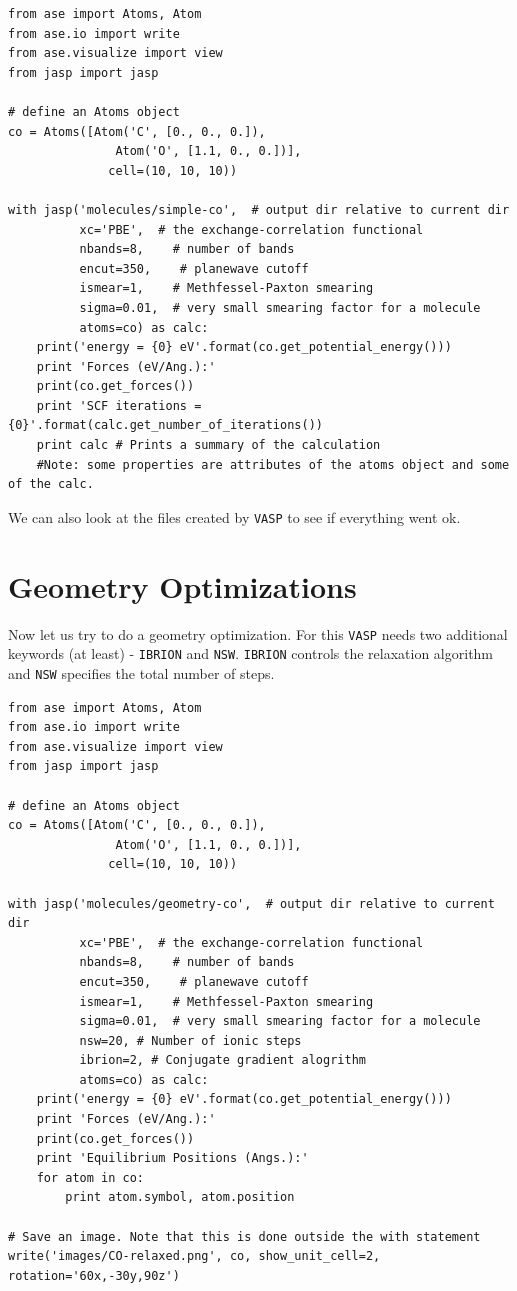 \documentclass[11pt]{article}
\begin{document}
\begin{verbatim}
from ase import Atoms, Atom
from ase.io import write
from ase.visualize import view
from jasp import jasp

# define an Atoms object
co = Atoms([Atom('C', [0., 0., 0.]),
               Atom('O', [1.1, 0., 0.])],
              cell=(10, 10, 10))

with jasp('molecules/simple-co',  # output dir relative to current dir
          xc='PBE',  # the exchange-correlation functional
          nbands=8,    # number of bands
          encut=350,    # planewave cutoff
          ismear=1,    # Methfessel-Paxton smearing
          sigma=0.01,  # very small smearing factor for a molecule
          atoms=co) as calc:
    print('energy = {0} eV'.format(co.get_potential_energy()))
    print 'Forces (eV/Ang.):'
    print(co.get_forces())
    print 'SCF iterations = {0}'.format(calc.get_number_of_iterations())
    print calc # Prints a summary of the calculation
    #Note: some properties are attributes of the atoms object and some of the calc.
\end{verbatim}

We can also look at the files created by \texttt{VASP} to see if everything went ok. 



\section{Geometry Optimizations}
\label{sec-6}

Now let us try to do a geometry optimization. For this \texttt{VASP} needs two additional keywords (at least) - \verb~IBRION~ and \verb~NSW~. \verb~IBRION~ controls the relaxation algorithm and \verb~NSW~ specifies the total number of steps.

\begin{verbatim}
from ase import Atoms, Atom
from ase.io import write
from ase.visualize import view
from jasp import jasp

# define an Atoms object
co = Atoms([Atom('C', [0., 0., 0.]),
               Atom('O', [1.1, 0., 0.])],
              cell=(10, 10, 10))

with jasp('molecules/geometry-co',  # output dir relative to current dir
          xc='PBE',  # the exchange-correlation functional
          nbands=8,    # number of bands
          encut=350,    # planewave cutoff
          ismear=1,    # Methfessel-Paxton smearing
          sigma=0.01,  # very small smearing factor for a molecule
          nsw=20, # Number of ionic steps
          ibrion=2, # Conjugate gradient alogrithm
          atoms=co) as calc:
    print('energy = {0} eV'.format(co.get_potential_energy()))
    print 'Forces (eV/Ang.):'
    print(co.get_forces())
    print 'Equilibrium Positions (Angs.):'
    for atom in co:
        print atom.symbol, atom.position
    
# Save an image. Note that this is done outside the with statement
write('images/CO-relaxed.png', co, show_unit_cell=2, rotation='60x,-30y,90z')
\end{verbatim}
\end{document}
